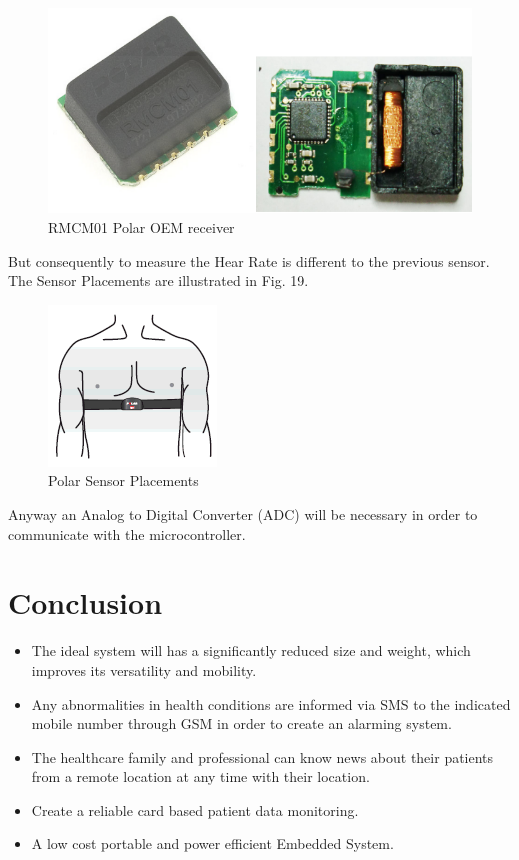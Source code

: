 \documentclass[10pt,journal,compsoc]{IEEEtran}
\begin{document}
\begin{enumerate}[\IEEEsetlabelwidth{3)}]
\begin{figure}[h]
  \centering
  \captionsetup{justification=centering}
  \includegraphics[scale=.30]{es17}
  \caption{RMCM01 Polar OEM receiver}
  \label{fig:fig18}
\end{figure}

%

But consequently to measure the Hear Rate is different to the previous sensor. The Sensor Placements are illustrated in Fig. 19.

\begin{figure}[h]
  \centering
  \captionsetup{justification=centering}
  \includegraphics[scale=.45]{es18}
  \caption{Polar Sensor Placements}
  \label{fig:fig19}
\end{figure}

%

Anyway an Analog to Digital Converter (ADC) will be necessary in order to communicate with the microcontroller.

\end{enumerate}


\section{Conclusion}

\begin{itemize}
  \item The ideal system will has a significantly reduced size and weight, which improves its versatility and mobility.
  \item Any abnormalities in health conditions are informed via SMS to the indicated mobile number through GSM in order to create an alarming system.
  \item The healthcare family and professional can know news about their patients from a remote location at any time with their location.
  \item Create a reliable card based patient data monitoring.
  \item A low cost portable and power efficient Embedded System.
\end{itemize}
  
\end{document}

